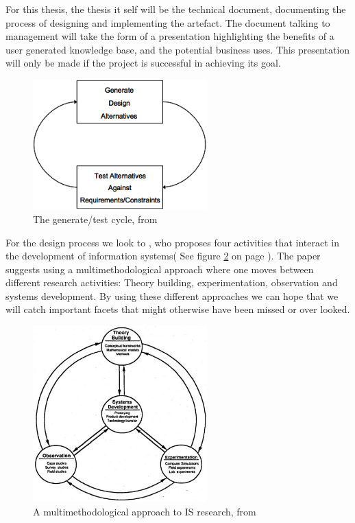 For this thesis, the thesis it self will be the technical document, documenting the process of designing and implementing the artefact.
The document talking to management will take the form of a presentation highlighting the benefits of a user generated knowledge base, and the potential business uses.
This presentation will only be made if the project is successful in achieving its goal.

\begin{figure}[h]
    \begin{center}
        \includegraphics[width=0.60\textwidth]{Images/GenerateTestCycle.png}
        \caption{The generate/test cycle, from \protect \citet{Hevner2004}}
        \label{GenerateTestCycle}
    \end{center}
\end{figure}

For the design process we look to \citet{Chen1990}, who proposes four activities that interact in the development of information systems( See figure \ref{multi} on page \pageref{multi}). 
The paper suggests using a multimethodological approach where one moves between different research activities: Theory building, experimentation, observation and systems development.
By using these different approaches we can hope that we will catch important facets that might otherwise have been missed or over looked.   

\begin{figure}[h]
    \begin{center}
        \includegraphics[width=0.60\textwidth]{Images/MultiMethodological.png}
        \caption{A multimethodological approach to IS research, from \protect \citet{Chen1990}}
        \label{multi}
    \end{center}
\end{figure}

